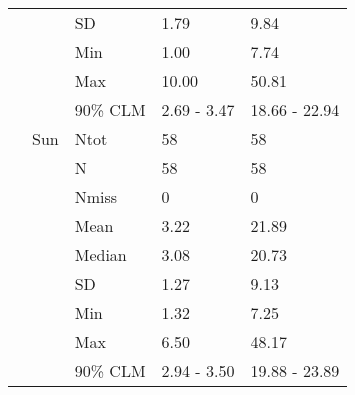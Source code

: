 \documentclass[8pt]{beamer}
\begin{document}
\begin{frame}
\begin{longtable}{p{3cm}llll}
 &  & SD & 1.79 & 9.84 \\
 &  & Min & 1.00 & 7.74 \\
 &  & Max & 10.00 & 50.81 \\
 &  & 90\% CLM & 2.69 - 3.47 & 18.66 - 22.94 \\
[2ex]
 & Sun & Ntot & 58 & 58 \\
 &  & N & 58 & 58 \\
 &  & Nmiss & 0 & 0 \\
 &  & Mean & 3.22 & 21.89 \\
 &  & Median & 3.08 & 20.73 \\
 &  & SD & 1.27 & 9.13 \\
 &  & Min & 1.32 & 7.25 \\
 &  & Max & 6.50 & 48.17 \\
 &  & 90\% CLM & 2.94 - 3.50 & 19.88 - 23.89 \\
[2ex]
\bottomrule\end{longtable}
\end{frame}
\end{document}
